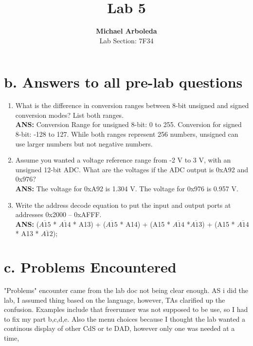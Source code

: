 \documentclass[11pt]{article}
\theoremstyle{plain}
\theoremstyle{definition}
\begin{document}
\captionsetup[figure]{labelfont=bf} 

\title{Lab 5}
\author{\textbf{Michael Arboleda}\\Lab Section: 7F34}
\maketitle
%
%
\section*{b. Answers to all pre-lab questions}



\begin{enumerate}[label={\arabic*)},font={\color{red}\bfseries}]
	\item What is the difference in conversion ranges between 8-bit unsigned and signed conversion modes? List both ranges.
	\\[0.8ex]
	\textbf{ANS: } Conversion Range for unsigned 8-bit: 0 to 255. Conversion for signed 8-bit: -128 to 127. While both ranges represent 256 numbers, unsigned can use larger numbers but not negative numbers.
	\item Assume you wanted a voltage reference range from -2 V to 3 V, with an unsigned 12-bit ADC. What are the voltages if the ADC output is 0xA92 and 0x976?
	\\[0.8ex]
	\textbf{ANS: } The voltage for 0xA92 is 1.304 V. The voltage for 0x976 is 0.957 V.
	\item Write the address decode equation to put the input and
	output ports at addresses 0x2000 – 0xAFFF. 
	\\[0.8ex]
	\textbf{ANS: } ($\overline{A15}$ * $\overline{A14}$ * A13) + ($\overline{A15}$ * A14) + (A15 * $\overline{A14}$ *$\overline{A13}$) + (A15 * $\overline{A14}$ * A13 * $\overline{A12}$);
\end{enumerate}
%
%
\section*{c. Problems Encountered} 
"Problems" encounter came from the lab doc not being clear enough. AS i did the lab, I assumed thing based on the language, however, TAs clarified up the confusion. Examples include that freerunner was not supposed to be use, so I had to fix my part b,c,d,e. Also the menu choices because I thought the lab wanted a continous display of other CdS or te DAD, however only one was needed at a time,  
%
%
\end{document}

